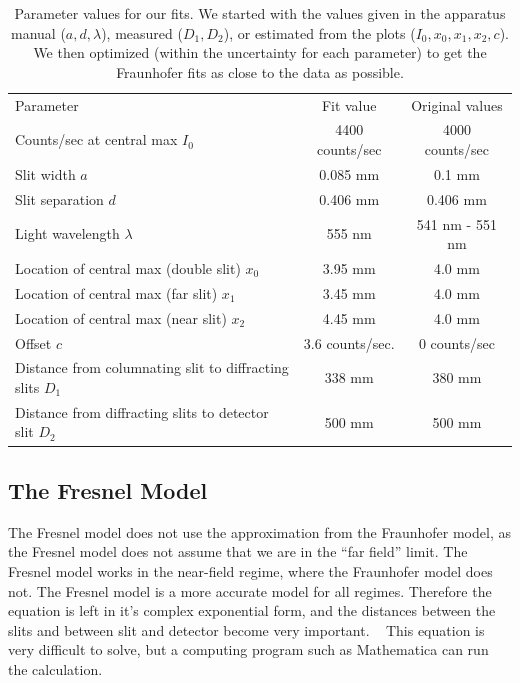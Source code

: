 \documentclass[prb,preprint]{revtex4-1}
\begin{document}
\begin{table}[h!]
\centering
\caption{Parameter values for our fits. We started with the values given in the apparatus manual ($a, d, \lambda$), measured ($D_1, D_2$), or estimated from the plots ($I_0, x_0, x_1, x_2, c$).  We then optimized (within the uncertainty for each parameter) to get the Fraunhofer fits as close to the data as possible. }
\begin{ruledtabular}
\begin{tabular}{lcc}
Parameter & Fit value & Original values      \\
Counts/sec at central max $I_0$     & 4400 counts/sec &  4000 counts/sec\\
Slit width $a$       & 0.085 mm        & 0.1 mm\\
Slit separation $d$       & 0.406 mm        & 0.406 mm\\
Light wavelength $\lambda$ & 555 nm          & 541 nm - 551 nm\\
Location of central max (double slit) $x_0$     & 3.95 mm         & 4.0 mm\\
Location of central max (far slit) $x_1$     & 3.45 mm & 4.0 mm\\
Location of central max (near slit) $x_2$ & 4.45 mm & 4.0 mm\\
Offset $c$       & 3.6 counts/sec. & 0 counts/sec\\
Distance from columnating slit to diffracting slits $D_1$     & 338 mm         & 380 mm\\
Distance from diffracting slits to detector slit $D_2$     & 500 mm         & 500 mm
\end{tabular}
\end{ruledtabular}
\label{parameters}
\end{table}

\subsection{The Fresnel Model}

The Fresnel model does not use the approximation from the Fraunhofer model, as the Fresnel model does not assume that we are in the ``far field'' limit.  The Fresnel model works in the near-field regime, where the Fraunhofer model does not.  The Fresnel model is a more accurate model for all regimes.
Therefore the equation is left in it's complex exponential form, and the distances between the slits and between slit and detector become very important.  ~\cite{wolfram} This equation is very difficult to solve, but a computing program such as Mathematica can run the calculation. 
\end{document}
